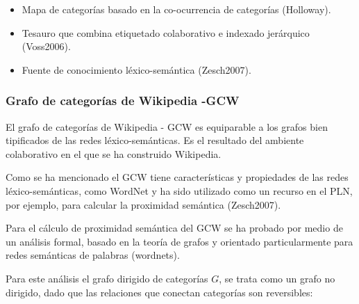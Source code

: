 \documentclass[letterpaper]{article}
\newcommand\textstylebibuscitbase[1]{#1}
\newcommand\liststyleLvii{%
\renewcommand\labelitemi{{\textbullet}}
\renewcommand\labelitemii{${\circ}$}
\renewcommand\labelitemiii{${\blacksquare}$}
\renewcommand\labelitemiv{{\textbullet}}
}
\begin{document}
\bigskip

\liststyleLvii
\begin{itemize}
\item {\sffamily
\foreignlanguage{spanish}{Mapa de categor\'ias basado en la
co-ocurrencia de categor\'ias
}\textstylebibuscitbase{\foreignlanguage{spanish}{(Holloway)}}\textstylebibuscitbase{\foreignlanguage{spanish}{.}}}
\item {\sffamily
\textstylebibuscitbase{\foreignlanguage{spanish}{Tesauro que combina
etiquetado colaborativo e indexado jer\'arquico
}}\textstylebibuscitbase{\foreignlanguage{spanish}{(Voss2006)}}\textstylebibuscitbase{\foreignlanguage{spanish}{.}}}
\item {\sffamily
\textstylebibuscitbase{\foreignlanguage{spanish}{Fuente de conocimiento
l\'exico-sem\'antica
}}\textstylebibuscitbase{\foreignlanguage{spanish}{(Zesch2007)}}\textstylebibuscitbase{\foreignlanguage{spanish}{.}}}
\end{itemize}

\bigskip

\subsubsection[Grafo de categor\'ias de Wikipedia {}-GCW]{Grafo de
categor\'ias de Wikipedia -GCW}
\hypertarget{RefHeading10776782078703}{}
\bigskip

{\sffamily
El grafo de categor\'ias de Wikipedia - GCW es equiparable a los grafos
bien tipificados de las redes l\'exico-sem\'anticas. Es el resultado
del ambiente colaborativo en el que se ha construido Wikipedia.}


\bigskip

{\sffamily
Como se ha mencionado el GCW tiene caracter\'isticas y propiedades de
las redes l\'exico-sem\'anticas, como WordNet y ha sido utilizado como
un recurso en el PLN, por ejemplo, para calcular la proximidad
sem\'antica
\textstylebibuscitbase{(Zesch2007)}\textstylebibuscitbase{.}}


\bigskip

{\sffamily
Para el c\'alculo de proximidad sem\'antica del GCW se ha probado por
medio de un an\'alisis formal, basado en la teor\'ia de grafos y
orientado particularmente para redes sem\'anticas de palabras
(wordnets).}


\bigskip

{\sffamily
\textstylebibuscitbase{Para este an\'alisis el grafo dirigido de
categor\'ias } $G$\textstylebibuscitbase{, se trata como un
}\textstylebibuscitbase{grafo no dirigido,}\textstylebibuscitbase{ dado
que las relaciones que conectan categor\'ias son reversibles:}}
\end{document}
